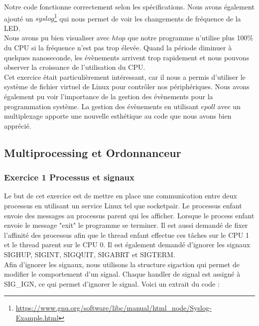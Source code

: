 \documentclass[
	a4paper, %
	10pt, %
]{CSUniSchoolLabReport}
\begin{document}
Notre code fonctionne correctement selon les spécifications. Nous avons également ajouté un $syslog$\footnote{\href{https://www.gnu.org/software/libc/manual/html_node/Syslog-Example.html}{https://www.gnu.org/software/libc/manual/html\_node/Syslog-Example.html}} qui nous permet de voir les changements de fréquence de la LED.\\
Nous avons pu bien visualiser avec $htop$ que notre programme n'utilise plus 100\% du CPU si la fréquence n'est pas trop élevée. Quand la période diminuer à quelques nanoseconde, les évènements arrivent trop rapidement et nous pouvons observer la croissance de l'utilisation du CPU.\\
Cet exercice était particulièrement intéressant, car il nous a permis d'utiliser le système de fichier virtuel de Linux pour contrôler nos périphériques. Nous avons également pu voir l'importance de la gestion des évènements pour la programmation système. La gestion des évènements en utilisant $epoll$ avec un multiplexage apporte une nouvelle esthétique au code que nous avons bien apprécié.

\subsection{Multiprocessing et Ordonnanceur}\label{multiprocess}
\subsubsection{Exercice 1 Processus et signaux}\label{MPEx1}
Le but de cet exercice est de mettre en place une communication entre deux processus en utilisant un service Linux tel que socketpair.
Le processus enfant envoie des messages au processus parent qui les afficher. Lorsque le process enfant envoie le message "exit" le programme se terminer.
Il est aussi demand\'e de fixer l'affinité des processus afin que le thread enfant effectue ces t\^aches sur le CPU 1 et le thread parent sur le CPU 0.
Il est également demandé d'ignorer les signaux SIGHUP, SIGINT, SIGQUIT, SIGABRT et SIGTERM.\\

Afin d'ignorer les signaux, nous utilisons la structure sigaction qui permet de modifier le comportement d'un signal.
Chaque handler de signal est assigné à SIG\_IGN, ce qui permet d'ignorer le signal.
Voici un extrait du code :
\end{document}

